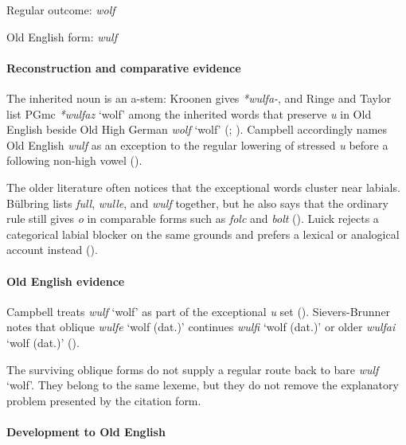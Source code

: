 \documentclass[
  british,
  a4paper,
]{article}
\providecommand{\Recon}[1]{\emph{*#1}}
\begin{document}
Regular outcome: \emph{wolf}

Old English form: \emph{wulf}

\paragraph{Reconstruction and comparative
evidence}\label{reconstruction-and-comparative-evidence-152}

The inherited noun is an a-stem: Kroonen gives \emph{*wulfa-}, and Ringe
and Taylor list PGmc \Recon{wulfaz} `wolf' among the inherited words
that preserve \emph{u} in Old English beside Old High German \emph{wolf}
`wolf' (;
). Campbell
accordingly names Old English \emph{wulf} as an exception to the regular
lowering of stressed \emph{u} before a following non-high vowel
().

The older literature often notices that the exceptional words cluster
near labials. Bülbring lists \emph{full}, \emph{wulle}, and \emph{wulf}
together, but he also says that the ordinary rule still gives \emph{o}
in comparable forms such as \emph{folc} and \emph{bolt}
(). Luick rejects a
categorical labial blocker on the same grounds and prefers a lexical or
analogical account instead ().

\paragraph{Old English evidence}\label{old-english-evidence-152}

Campbell treats \emph{wulf} `wolf' as part of the exceptional \emph{u}
set ().
Sievers-Brunner notes that oblique {\emph{wulfe}} `wolf (dat.)'
continues {\emph{wulfi}} `wolf (dat.)' or older {\emph{wulfai}} `wolf
(dat.)' ().

The surviving oblique forms do not supply a regular route back to bare
\emph{wulf} `wolf'. They belong to the same lexeme, but they do not
remove the explanatory problem presented by the citation form.

\paragraph{Development to Old
English}\label{development-to-old-english-152}
\end{document}
